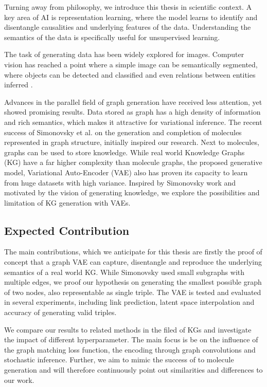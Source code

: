 Turning away from philosophy, we introduce this thesis in scientific context. A key area of AI is representation learning, where the model learns to identify and disentangle causalities and underlying features of the data. Understanding the semantics of the data is specifically useful for unsupervised learning. 


The task of generating data has been widely explored for images. Computer vision has reached a point where a simple image can be semantically segmented, where objects can be detected and classified and even relations between entities inferred \cite{kipf_contrastive_2020}.


Advances in the parallel field of  graph generation have received less attention, yet showed promising results. Data stored as graph has a high density of information and rich semantics, which makes it attractive for variational inference. The recent success of Simonovsky et al. \cite{simonovsky_graphvae_2018} on the generation and completion of molecules represented in graph structure, initially inspired our research. Next to molecules, graphs can be used to store knowledge. While real world Knowledge Graphs (KG) have a far higher complexity than molecule graphs, the proposed generative model, Variational Auto-Encoder (VAE) also has proven its capacity to learn from huge datasets with high variance. Inspired by Simonovsky work and motivated by the vision of generating knowledge, we explore the possibilities and limitation of KG generation with VAEs.



\subsection{Expected Contribution}

The main contributions, which we anticipate for this thesis are firstly the proof of concept that a graph VAE can capture, disentangle and reproduce the underlying semantics of a real world KG. While Simonovsky used small subgraphs with multiple edges, we proof our hypothesis on  generating the smallest possible graph of two nodes, also representable as single triple. The VAE is tested and evaluated in several experiments, including link prediction, latent space interpolation and accuracy of generating valid triples.


We compare our results to related methods in the filed of KGs and investigate the impact of different hyperparameter. The main focus is be on the influence of the graph matching loss function, the encoding through graph convolutions and stochastic inference. Further, we aim to mimic the success of to molecule generation and will therefore continuously point out similarities and differences to our work.

